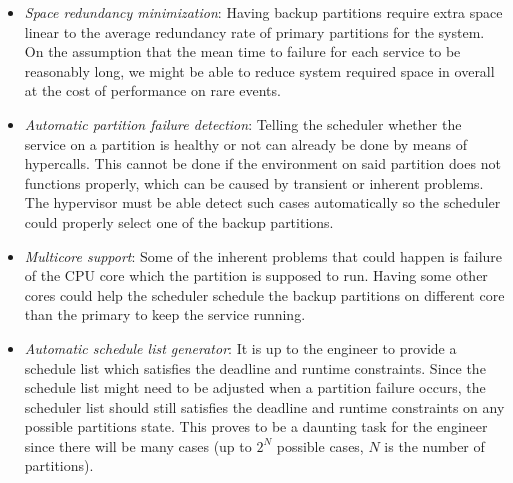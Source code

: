 \begin{itemize}

	\item \textit{Space redundancy minimization}: Having backup partitions require extra
		space linear to the average redundancy rate of primary partitions for the
		system. On the assumption that the mean time to failure for each service to be
		reasonably long, we might be able to reduce system required space in overall at
		the cost of performance on rare events.

	\item \textit{Automatic partition failure detection}: Telling the scheduler whether the
		service on a partition is healthy or not can already be done by means of
		hypercalls. This cannot be done if the environment on said partition does not
		functions properly, which can be caused by transient or inherent problems. The
		hypervisor must be able detect such cases automatically so the scheduler could
		properly select one of the backup partitions.

	\item \textit{Multicore support}: Some of the inherent problems that could happen is
		failure of the CPU core which the partition is supposed to run.
		Having some other cores could help the scheduler schedule the backup partitions
		on different core than the primary to keep the service running.

	\item \textit{Automatic schedule list generator}: It is up to the engineer to provide a
		schedule list which satisfies the deadline and runtime constraints. Since the
		schedule list might need to be adjusted when a partition failure occurs, the
		scheduler list should still satisfies the deadline and runtime constraints on
		any possible partitions state. This proves to be a daunting task for the
		engineer since there will be many cases (up to $2^N$ possible cases, $N$ is the
		number of partitions).

\end{itemize}

